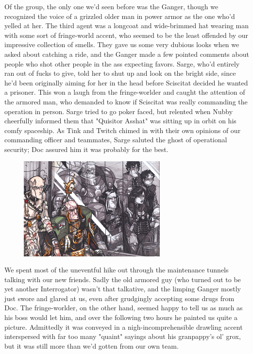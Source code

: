 Of the group, the only one we'd seen before was the Ganger, though we recognized the voice of a grizzled older man in power armor as the one who'd yelled at her. 
The third agent was a longcoat and wide-brimmed hat wearing man with some sort of fringe-world accent, who seemed to be the least offended by our impressive collection of smells. 
They gave us some very dubious looks when we asked about catching a ride, and the Ganger made a few pointed comments about people who shot other people in the ass expecting favors. 
Sarge, who'd entirely ran out of fucks to give, told her to shut up and look on the bright side, since he'd been originally aiming for her in the head before Sciscitat decided he wanted a prisoner. 
This won a laugh from the fringe-worlder and caught the attention of the armored man, who demanded to know if Sciscitat was really commanding the operation in person. 
Sarge tried to go poker faced, but relented when Nubby cheerfully informed them that "Quisitor Asshat" was sitting up in orbit on his comfy spaceship. 
As Tink and Twitch chimed in with their own opinions of our commanding officer and teammates, Sarge saluted the ghost of operational security; 
Doc assured him it was probably for the best.

\begin{figure}
	\begin{center}
		\includegraphics[width=\figwidth]{pics/18/39.png}
	\end{center}
\end{figure}
We spent most of the uneventful hike out through the maintenance tunnels talking with our new friends. 
Sadly the old armored guy (who turned out to be yet another Interrogator) wasn't that talkative, and the limping Ganger mostly just swore and glared at us, even after grudgingly accepting some drugs from Doc. 
The fringe-worlder, on the other hand, seemed happy to tell us as much as his boss would let him, and over the following two hours he painted us quite a picture. 
Admittedly it was conveyed in a nigh-incomprehensible drawling accent interspersed with far too many "quaint" sayings about his granpappy's ol' grox, but it was still more than we'd gotten from our own team.


